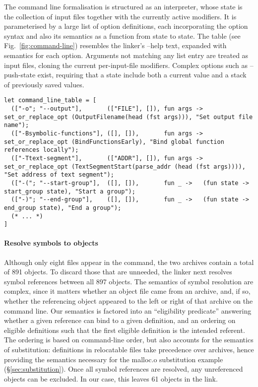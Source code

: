 The command line formalisation is structured as an interpreter, whose state 
is the collection of input files together with the currently active modifiers.
It is parameterised by a large list of option definitions, 
each incorporating the option syntax and also its semantics as a function from state to state.
The table (see Fig.~\ref{fig:command-line}) resembles the linker's \textsf{--help} text, expanded
with semantics for each option.
Arguments not matching any list entry are treated as input files, cloning the current per-input-file modifiers.
Complex options such as \textsf{--push-state} exist, requiring that a state include both a current value and a stack of previously saved values.

\begin{figure*}
\begin{lstlisting}[language=plain,basicstyle=\scriptsize\sffamily]
let command_line_table = [
  (["-o"; "--output"],       (["FILE"], []), fun args -> set_or_replace_opt (OutputFilename(head (fst args))), "Set output file name");
  (["-Bsymbolic-functions"], ([], []),       fun args -> set_or_replace_opt (BindFunctionsEarly), "Bind global function references locally");
  (["-Ttext-segment"],       (["ADDR"], []), fun args -> set_or_replace_opt (TextSegmentStart(parse_addr (head (fst args)))), "Set address of text segment");
  (["-("; "--start-group"],  ([], []),       fun _ ->   (fun state -> start_group state), "Start a group");
  (["-)"; "--end-group"],    ([], []),       fun _ ->   (fun state -> end_group state), "End a group");
  (* ... *)
]
\end{lstlisting}
\caption{Excerpt from the specification of GNU linker command-line options}
\label{fig:command-line}
\end{figure*}

\paragraph{Resolve symbols to objects} 
Although only eight files appear in the command, the two archives contain a total of 891 objects.
To discard those that are unneeded, the linker next resolves symbol references between all 897 objects.
The semantics of symbol resolution are complex, since 
it matters whether an object file came from an archive, and, if so, 
whether the referencing object appeared to the left or right of that archive on the command line.
Our semantics is factored into an ``eligibility predicate'' answering whether a given
reference can bind to a given definition, and an 
ordering on eligible definitions such that
the first eligible definition is the intended referent.
The ordering is based on command-line order, but also accounts for the semantics of 
substitution: definitions in relocatable files take precedence over archives, hence 
providing the semantics necessary for the \textsf{malloc.o} substitution example (\S\ref{sec:substitution}).
Once all symbol references are resolved, any unreferenced objects can be excluded.
In our case, this leaves 61 objects in the link.

